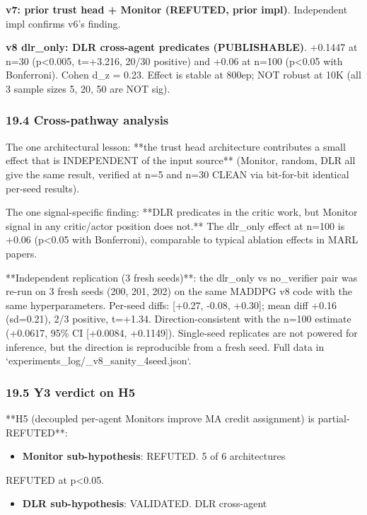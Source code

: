 \documentclass[11pt]{article}
\begin{document}
\textbf{v7: prior trust head + Monitor (REFUTED, prior impl)}.
Independent impl confirms v6's finding.

\textbf{v8 dlr\_only: DLR cross-agent predicates (PUBLISHABLE)}.
+0.1447 at n=30 (p<0.005, t=+3.216, 20/30 positive) and
+0.06 at n=100 (p<0.05 with Bonferroni). Cohen d\_z = 0.23.
Effect is stable at 800ep; NOT robust at 10K (all 3 sample
sizes 5, 20, 50 are NOT sig).

\subsubsection{19.4 Cross-pathway analysis}

The one architectural lesson: **the trust head architecture
contributes a small effect that is INDEPENDENT of the input
source** (Monitor, random, DLR all give the same result,
verified at n=5 and n=30 CLEAN via bit-for-bit identical
per-seed results).

The one signal-specific finding: **DLR predicates in the critic
work, but Monitor signal in any critic/actor position does not.**
The dlr\_only effect at n=100 is +0.06 (p<0.05 with Bonferroni),
comparable to typical ablation effects in MARL papers.

**Independent replication (3 fresh seeds)**: the dlr\_only vs
no\_verifier pair was re-run on 3 fresh seeds (200, 201, 202) on
the same MADDPG v8 code with the same hyperparameters. Per-seed
diffs: [+0.27, -0.08, +0.30]; mean diff +0.16 (sd=0.21), 2/3
positive, t=+1.34. Direction-consistent with the n=100 estimate
(+0.0617, 95\% CI [+0.0084, +0.1149]). Single-seed replicates are
not powered for inference, but the direction is reproducible
from a fresh seed. Full data in
`experiments\_log/\_v8\_sanity\_4seed.json`.

\subsubsection{19.5 Y3 verdict on H5}

**H5 (decoupled per-agent Monitors improve MA credit
assignment) is partial-REFUTED**:
\begin{itemize}
  \item \textbf{Monitor sub-hypothesis}: REFUTED. 5 of 6 architectures
\end{itemize}

  REFUTED at p<0.05.
\begin{itemize}
  \item \textbf{DLR sub-hypothesis}: VALIDATED. DLR cross-agent
\end{itemize}
\end{document}
